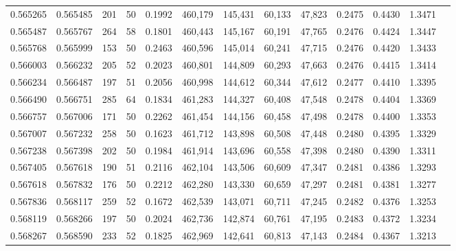 \begin{tabular}{rrrrrrrrrrrrr}
0.565265 & 0.565485 &   201 &  50 &                                     0.1992 & 460,179 & 145,431 &  60,133 &  47,823 & 0.2475 & 0.4430 & 1.3471 \\
0.565487 & 0.565767 &   264 &  58 &                                     0.1801 & 460,443 & 145,167 &  60,191 &  47,765 & 0.2476 & 0.4424 & 1.3447 \\
0.565768 & 0.565999 &   153 &  50 &                                     0.2463 & 460,596 & 145,014 &  60,241 &  47,715 & 0.2476 & 0.4420 & 1.3433 \\
0.566003 & 0.566232 &   205 &  52 &                                     0.2023 & 460,801 & 144,809 &  60,293 &  47,663 & 0.2476 & 0.4415 & 1.3414 \\
0.566234 & 0.566487 &   197 &  51 &                                     0.2056 & 460,998 & 144,612 &  60,344 &  47,612 & 0.2477 & 0.4410 & 1.3395 \\
0.566490 & 0.566751 &   285 &  64 &                                     0.1834 & 461,283 & 144,327 &  60,408 &  47,548 & 0.2478 & 0.4404 & 1.3369 \\
0.566757 & 0.567006 &   171 &  50 &                                     0.2262 & 461,454 & 144,156 &  60,458 &  47,498 & 0.2478 & 0.4400 & 1.3353 \\
0.567007 & 0.567232 &   258 &  50 &                                     0.1623 & 461,712 & 143,898 &  60,508 &  47,448 & 0.2480 & 0.4395 & 1.3329 \\
0.567238 & 0.567398 &   202 &  50 &                                     0.1984 & 461,914 & 143,696 &  60,558 &  47,398 & 0.2480 & 0.4390 & 1.3311 \\
0.567405 & 0.567618 &   190 &  51 &                                     0.2116 & 462,104 & 143,506 &  60,609 &  47,347 & 0.2481 & 0.4386 & 1.3293 \\
0.567618 & 0.567832 &   176 &  50 &                                     0.2212 & 462,280 & 143,330 &  60,659 &  47,297 & 0.2481 & 0.4381 & 1.3277 \\
0.567836 & 0.568117 &   259 &  52 &                                     0.1672 & 462,539 & 143,071 &  60,711 &  47,245 & 0.2482 & 0.4376 & 1.3253 \\
0.568119 & 0.568266 &   197 &  50 &                                     0.2024 & 462,736 & 142,874 &  60,761 &  47,195 & 0.2483 & 0.4372 & 1.3234 \\
0.568267 & 0.568590 &   233 &  52 &                                     0.1825 & 462,969 & 142,641 &  60,813 &  47,143 & 0.2484 & 0.4367 & 1.3213 \\

\end{tabular}

